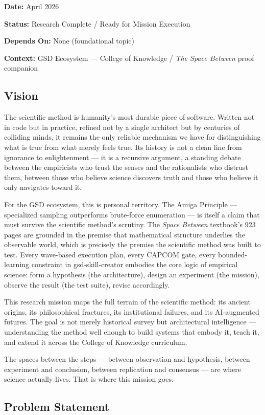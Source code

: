 \documentclass[11pt,letterpaper]{article}
\newcommand{\metafield}[2]{\textbf{\sffamily #1} #2\par}
\begin{document}
\metafield{Date:}{April 2026}
\metafield{Status:}{Research Complete / Ready for Mission Execution}
\metafield{Depends On:}{None (foundational topic)}
\metafield{Context:}{GSD Ecosystem --- College of Knowledge / \emph{The Space Between} proof companion}

\subsection{Vision}

The scientific method is humanity's most durable piece of software. Written not in code but in practice, refined not by a single architect but by centuries of colliding minds, it remains the only reliable mechanism we have for distinguishing what is true from what merely feels true. Its history is not a clean line from ignorance to enlightenment --- it is a recursive argument, a standing debate between the empiricists who trust the senses and the rationalists who distrust them, between those who believe science discovers truth and those who believe it only navigates toward it.

For the GSD ecosystem, this is personal territory. The Amiga Principle --- specialized sampling outperforms brute-force enumeration --- is itself a claim that must survive the scientific method's scrutiny. The \emph{Space Between} textbook's 923 pages are grounded in the premise that mathematical structure underlies the observable world, which is precisely the premise the scientific method was built to test. Every wave-based execution plan, every CAPCOM gate, every bounded-learning constraint in gsd-skill-creator embodies the core logic of empirical science: form a hypothesis (the architecture), design an experiment (the mission), observe the result (the test suite), revise accordingly.

This research mission maps the full terrain of the scientific method: its ancient origins, its philosophical fractures, its institutional failures, and its AI-augmented futures. The goal is not merely historical survey but architectural intelligence --- understanding the method well enough to build systems that embody it, teach it, and extend it across the College of Knowledge curriculum.

The spaces between the steps --- between observation and hypothesis, between experiment and conclusion, between replication and consensus --- are where science actually lives. That is where this mission goes.

\subsection{Problem Statement}
\end{document}
